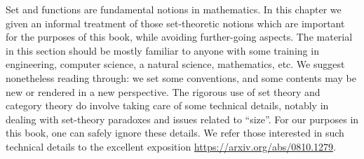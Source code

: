 


Set and functions are fundamental notions in mathematics. In this chapter we given an informal treatment of those set-theoretic notions which are important for the purposes of this book, while avoiding further-going aspects. The material in this section should be mostly familiar to anyone with some training in engineering, computer science, a natural science, mathematics, etc. We suggest nonetheless reading through: we set some conventions, and some contents may be new or rendered in a new perspective. The rigorous use of set theory and category theory do involve taking care of some technical details, notably in dealing with set-theory paradoxes and issues related to ``size''. For our purposes in this book, one can safely ignore these details. We refer those interested in such technical details to the excellent exposition \url{https://arxiv.org/abs/0810.1279}.  


\label{ch:sets}







